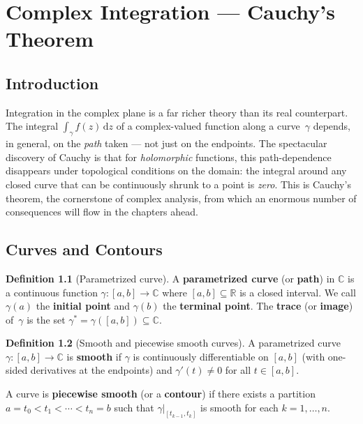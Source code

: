 \documentclass[12pt,a4paper,openany]{book}
\theoremstyle{definition}
\newtheorem{definition}{Definition}[chapter]
\theoremstyle{plain}
\theoremstyle{remark}
\newcommand{\C}{\mathbb{C}}
\newcommand{\R}{\mathbb{R}}
\newcommand{\dd}{\mathrm{d}}
\begin{document}
\chapter{Complex Integration --- Cauchy's Theorem}
\label{chap:complex-integration}

\section*{Introduction}

Integration in the complex plane is a far richer theory than its real
counterpart.  The integral $\int_\gamma f(z)\,\dd z$ of a complex-valued
function along a curve~$\gamma$ depends, in general, on the \emph{path} taken
--- not just on the endpoints.  The spectacular discovery of Cauchy is that for
\emph{holomorphic} functions, this path-dependence disappears under topological
conditions on the domain: the integral around any closed curve that can be
continuously shrunk to a point is \emph{zero}.  This is Cauchy's theorem, the
cornerstone of complex analysis, from which an enormous number of consequences
will flow in the chapters ahead.

\section{Curves and Contours}
\label{sec:curves-contours}

\begin{definition}[Parametrized curve]\label{def:parametrized-curve}
A \textbf{parametrized curve} (or \textbf{path}) in
$\C$ is a continuous function $\gamma\colon[a,b]\to\C$ where $[a,b]\subseteq\R$
is a closed interval.  We call $\gamma(a)$ the \textbf{initial point} and
$\gamma(b)$ the \textbf{terminal point}.  The \textbf{trace} (or \textbf{image})
of~$\gamma$ is the set $\gamma^* = \gamma([a,b])\subseteq\C$.
\end{definition}

\begin{definition}[Smooth and piecewise smooth curves]\label{def:smooth-curve}
A parametrized curve $\gamma\colon[a,b]\to\C$ is \textbf{smooth}
if $\gamma$ is continuously differentiable on $[a,b]$ (with one-sided derivatives
at the endpoints) and $\gamma'(t)\ne 0$ for all $t\in[a,b]$.

A curve is \textbf{piecewise smooth} (or a
\textbf{contour}) if there exists a partition
$a = t_0 < t_1 < \cdots < t_n = b$ such that $\gamma|_{[t_{k-1},t_k]}$ is
smooth for each $k=1,\dots,n$.
\end{definition}
\end{document}
